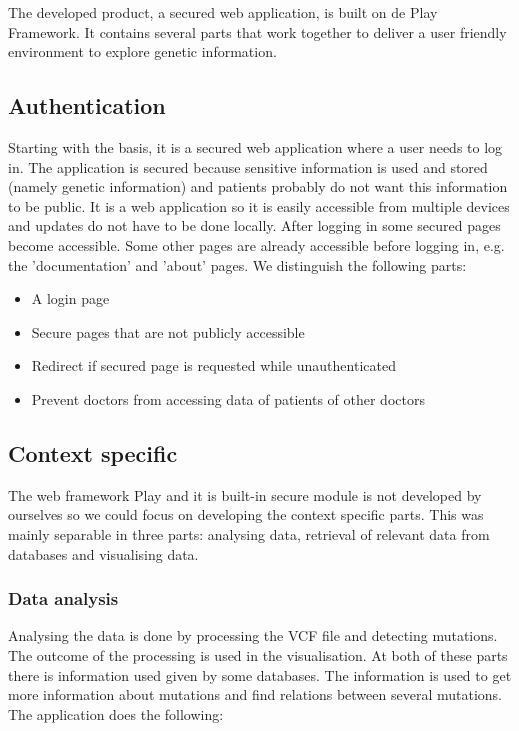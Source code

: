 The developed product, a secured web application, is built on de Play Framework. It contains several parts that work together to deliver a user friendly environment to explore genetic information.

\subsection{Authentication}

Starting with the basis, it is a secured web application where a user needs to log in. The application is secured because sensitive information is used and stored (namely genetic information) and patients probably do not want this information to be public. It is a web application so it is easily accessible from multiple devices and updates do not have to be done locally. After logging in some secured pages become accessible. Some other pages are already accessible before logging in, e.g. the 'documentation' and 'about' pages. We distinguish the following parts:

\begin{itemize}
  \item A login page
  \item Secure pages that are not publicly accessible
  \item Redirect if secured page is requested while unauthenticated
  \item Prevent doctors from accessing data of patients of other doctors
\end{itemize}

\subsection{Context specific}

The web framework Play and it is built-in secure module is not developed by ourselves so we could focus on developing the context specific parts. This was mainly separable in three parts: analysing data, retrieval of relevant data from databases and visualising data.

\subsubsection{Data analysis}

Analysing the data is done by processing the VCF file and detecting mutations. The outcome of the processing is used in the visualisation. At both of these parts there is information used given by some databases. The information is used to get more information about mutations and find relations between several mutations. The application does the following:


